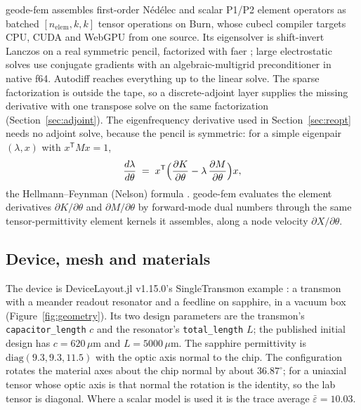 \documentclass{anvil-paper}
\begin{document}
geode-fem assembles first-order N\'ed\'elec \citep{nedelec1980} and
scalar P1/P2 element operators as batched $[n_{\mathrm{elem}},k,k]$ tensor
operations on Burn, whose cubecl compiler targets CPU, CUDA and WebGPU
from one source. Its eigensolver is shift-invert Lanczos \citep{arpack} on
a real symmetric pencil, factorized with faer \citep{kazdadi2026faer};
large electrostatic solves use conjugate gradients with an
algebraic-multigrid preconditioner in native f64. Autodiff reaches
everything up to the linear solve. The sparse factorization is outside
the tape, so a discrete-adjoint layer supplies the missing derivative with
one transpose solve on the same factorization
(Section~\ref{sec:adjoint}). The eigenfrequency derivative used in
Section~\ref{sec:reopt} needs no adjoint solve, because the pencil is
symmetric: for a simple eigenpair $(\lambda, x)$ with $x^{\mathsf T}Mx =
1$,
\begin{equation}
  \frac{d\lambda}{d\theta} \;=\;
  x^{\mathsf T}\Bigl(\frac{\partial K}{\partial\theta}
  - \lambda\,\frac{\partial M}{\partial\theta}\Bigr)x ,
  \label{eq:hf-eig}
\end{equation}
the Hellmann--Feynman (Nelson) formula \citep{nelson1976simplified}. geode-fem
evaluates the element derivatives $\partial K/\partial\theta$ and
$\partial M/\partial\theta$ by forward-mode dual numbers through the same
tensor-permittivity element kernels it assembles, along a node velocity
$\partial X/\partial\theta$.

\subsection{Device, mesh and materials}
\label{sec:geometry}

The device is DeviceLayout.jl v1.15.0's SingleTransmon example
\citep{devicelayout}: a transmon with a meander readout resonator and a
feedline on sapphire, in a vacuum box (Figure~\ref{fig:geometry}). Its two
design parameters are the transmon's \texttt{capacitor\_length} $c$ and the
resonator's \texttt{total\_length} $L$; the published initial design has
$c = 620\,\mu$m and $L = 5000\,\mu$m. The sapphire permittivity is
$\mathrm{diag}(9.3, 9.3, 11.5)$ with the optic axis normal to the chip.
The configuration rotates the material axes about the chip normal by
about $36.87^\circ$; for a uniaxial tensor whose optic axis is that normal
the rotation is the identity, so the lab tensor is diagonal. Where a
scalar model is used it is the trace average $\bar\varepsilon = 10.03$.
\end{document}
